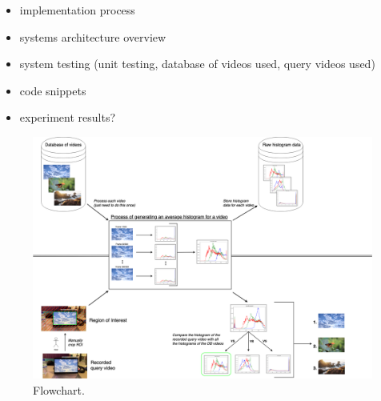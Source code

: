 \begin{itemize}
    \item implementation process
    \item systems architecture overview
    \item system testing (unit testing, database of videos used, query videos used)
    \item code snippets
    \item experiment results?
\end{itemize}

\begin{figure}[h] 
\centerline{\includegraphics[width=\textwidth]{figures/CBVR flowchart.png}}
\caption{\label{fig:wireframe}Flowchart.}
\end{figure}